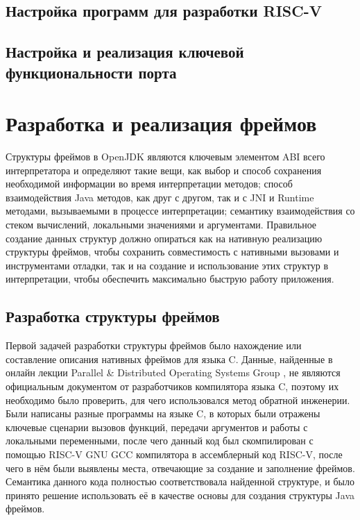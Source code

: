 \documentclass[14pt]{spbau-diploma}
\begin{document}
\subsection{Настройка программ для разработки RISC-V}
\subsection{Настройка и реализация ключевой функциональности порта}

\section{Разработка и реализация фреймов}
Структуры фреймов в OpenJDK являются ключевым элементом ABI всего интерпретатора и определяют такие вещи, как выбор и способ сохранения необходимой информации во время интерпретации методов; способ взаимодействия Java методов, как друг с другом, так и с JNI и Runtime методами, вызываемыми в процессе интерпретации; семантику взаимодействия со стеком вычислений, локальными значениями и аргументами. Правильное создание данных структур должно опираться как на нативную реализацию структуры фреймов, чтобы сохранить совместимость с нативными вызовами и инструментами отладки, так и на создание и использование этих структур в интерпретации, чтобы обеспечить максимально быструю работу приложения.

\subsection{Разработка структуры фреймов}
Первой задачей разработки структуры фреймов было нахождение или составление описания нативных фреймов для языка C. Данные, найденные в онлайн лекции Parallel \& Distributed Operating Systems Group \cite{lecture:frames}, не являются официальным документом от разработчиков компилятора языка C, поэтому их необходимо было проверить, для чего использовался метод обратной инженерии. Были написаны разные программы на языке C, в которых были отражены ключевые сценарии вызовов функций, передачи аргументов и работы с локальными переменными, после чего данный код был скомпилирован с помощью RISC-V GNU GCC \cite{riscv:gnu} компилятора в ассемблерный код RISC-V, после чего в нём были выявлены места, отвечающие за создание и заполнение фреймов. Семантика данного кода полностью соответствовала найденной структуре, и было принято решение использовать её в качестве основы для создания структуры Java фреймов. 
\end{document}
